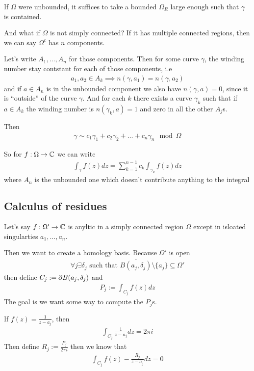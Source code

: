 If $\Omega$ were unbounded, it suffices to take a bounded $\Omega_R$ large enough such that $\gamma$ is contained.





And what if $\Omega$ is not simply connected? If it has multiple connected regions, then we can say $\Omega^{c}$ has $n$ components.

Let's write $A_{1}, \ldots, A_{n}$ for those components. Then for some curve $\gamma$, the winding number stay contstant for each of those components, i.e
\begin{align*}
	a_1,a_2 \in A_k \implies n(\gamma,a_1) = n(\gamma,a_2)
\end{align*}
and if $a \in A_n$ is in the unbounded component we also have $n(\gamma,a) = 0$, since it is ``outside'' of the curve $\gamma$.
And for each $k$ there exists a curve $\gamma_k$ such that if $a \in A_k$ the winding number is $n(\gamma_k,a) = 1$ and zero in all the other $A_j$s.


Then 
\begin{align*}
	\gamma \sim c_1 \gamma_1 + c_2 \gamma_2 + \ldots + c_n \gamma_n \mod \Omega
\end{align*}

So for $f: \Omega \to \mathbb{C}$ we can write
\begin{align*}
	\int_{\gamma} f(z) dz = \sum_{k=1}^{n-1} c_k \int_{\gamma_k}f(z) dz
\end{align*}
where $A_n$ is the unbounded one which doesn't contribute anything to the integral


\subsection{Calculus of residues}
Let's say $f: \Omega' \to \mathbb{C}$ is anyltic in a simply connected region $\Omega$ except in isloated singularties $a_1, \ldots, a_n$.

Then we want to create a homology basis. Because $\Omega'$ is open
\begin{align*}
	\forall j \exists \delta_j \text{ such that } \overline{B(a_j,\delta_j)} \setminus \{a_j\} \subseteq \Omega'
\end{align*}
then define $C_j := \partial B(a_j, \delta_j)$ and
\begin{align*}
	P_j := \int_{C_j} f(z) dz
\end{align*}
The goal is we want some way to compute the $P_j$s.

If $f(z) = \frac{1}{z - a_j}$, then
\begin{align*}
	\int_{C_j} \frac{1}{z- a_j}dz = 2\pi i	
\end{align*}
Then define $R_j := \frac{P_j}{2\pi i}$ then we know that
\begin{align*}
	\int_{C_j}f(z) - \frac{R_j}{z - a_j} dz = 0
\end{align*}

